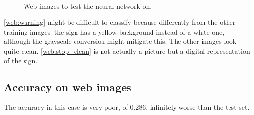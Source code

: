 \documentclass{article}
\begin{document}
\begin{figure}
\\
\caption{Web images to test the neural network on.}
\label{fig:webimgs}
\end{figure}

\autoref{web:warning} might be difficult to classify because differently from the other training images, the sign has a yellow background instead of a white one, although the grayscale conversion might mitigate this. The other images look quite clean. \autoref{web:stop_clean} is not actually a picture but a digital representation of the sign. 


\subsection{Accuracy on web images}
The accuracy in this case is very poor, of $0.286$, infinitely worse than the test set. 
\end{document}
